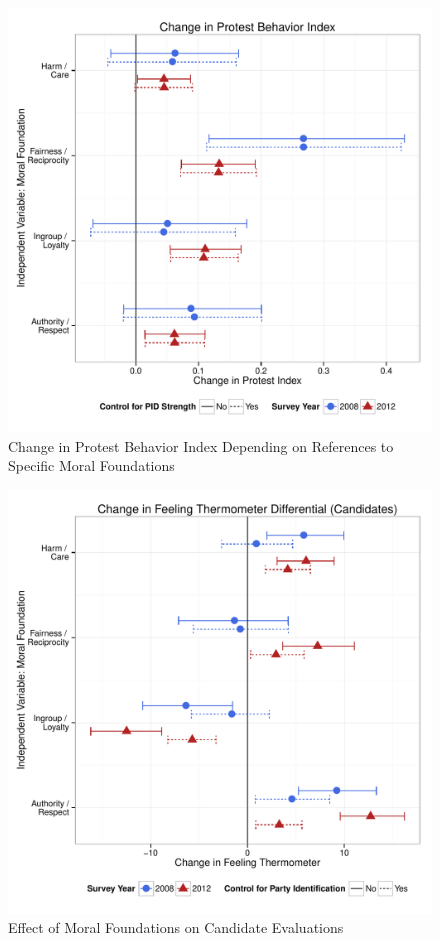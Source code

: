 \documentclass[12pt]{paper}
\begin{document}
\begin{figure}[ht]\centering
\includegraphics[scale=.6]{../calc/fig/m2e_part.pdf}
\caption{Change in Protest Behavior Index Depending on References to Specific Moral Foundations}\label{fig:m2b_vote}
\end{figure}

\begin{figure}[ht]\centering
\includegraphics[scale=.6]{../calc/fig/m2g_vote.pdf}
\caption{Effect of Moral Foundations on Candidate Evaluations}\label{fig:m2f_vote}
\end{figure}
\end{document}
